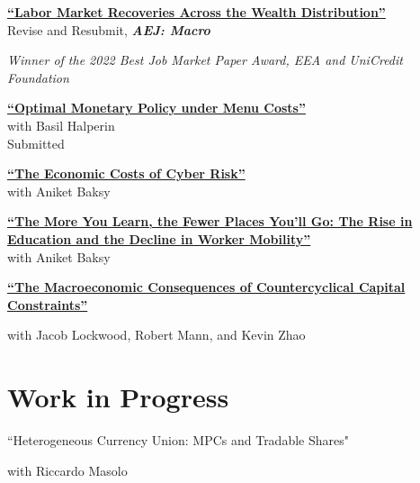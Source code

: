 \documentclass[margin,line]{res}                          %
\newenvironment{list1}{
	\begin{list}{\ding{113}}{%
			\setlength{\itemsep}{0in}
			\setlength{\parsep}{0in} \setlength{\parskip}{0in}
			\setlength{\topsep}{0in} \setlength{\partopsep}{0in}
			\setlength{\leftmargin}{0.17in}}}{\end{list}}
\begin{document}
\begin{resume}
\begin{list1}
		\vspace{7pt}
		
		\item[] \href{https://danicaratelli.github.io/research/papers/JMP_Caratelli.pdf}{\textbf{{\color{darkblue}``Labor Market Recoveries Across the Wealth Distribution''}}}\\
		Revise and Resubmit, \textit{\textbf{AEJ: Macro}}
		\item[] \emph{\textit{Winner of the 2022 Best Job Market Paper Award, EEA and UniCredit Foundation}}\smallskip
		
		\vspace{7pt}
		
		\item[] \href{https://danicaratelli.github.io/research/papers/OptimalMP_CaratelliHalperin.pdf}{\textbf{``Optimal Monetary Policy under Menu Costs''}}\\ with Basil Halperin\\
		Submitted\smallskip
		
		\vspace{7pt}

		\item[] \href{https://danicaratelli.github.io/research/papers/Cybersecurity_GE.pdf}{\textbf{``The Economic Costs of Cyber Risk''}}\\ with Aniket Baksy\smallskip
		
		\vspace{7pt}
		
		\item[] \href{https://danicaratelli.github.io/research/papers/The_Long_term_Decline_of_the_US_Job_Ladder.pdf}{\textbf{{\color{darkblue}``The More You Learn, the Fewer Places You’ll Go: The Rise in Education and the Decline in Worker Mobility''}}}\\ 
		with Aniket Baksy\smallskip
		
		\vspace{7pt}
		
		\item[] \href{https://danicaratelli.github.io/research/papers/Macroeconomic Consequences of Capital Constraints.pdf}{\textbf{{\color{darkblue}``The Macroeconomic Consequences of Countercyclical Capital Constraints''}}}
		\item[] with Jacob Lockwood, Robert Mann, and Kevin Zhao
		
	\end{list1}
	
	\section{\sc Work in Progress}
	\begin{list1}
		\item[] ``Heterogeneous Currency Union: MPCs and Tradable Shares"		
		\item[] with Riccardo Masolo \smallskip
	\end{list1}
	

\end{resume}
\end{document}
